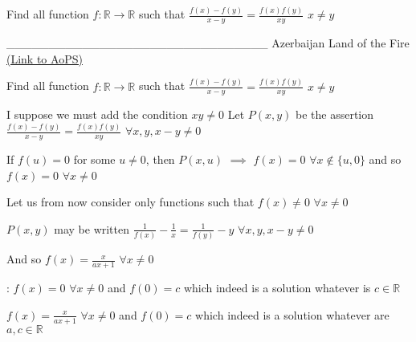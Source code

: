 \begin{problem}
	Find all function $f: \mathbb{R}\to\mathbb{R}$ such that  $\frac{f(x)-f(y)}{x-y}=\frac{f(x)f(y)}{xy} $
$x{\neq}y$



_______________________________
Azerbaijan Land of the Fire 
	\flushright \href{https://artofproblemsolving.com/community/c6h474469}{(Link to AoPS)}
\end{problem}



\begin{solution}
	\begin{tcolorbox}Find all function $f: \mathbb{R}\to\mathbb{R}$ such that  $\frac{f(x)-f(y)}{x-y}=\frac{f(x)f(y)}{xy} $
$x{\neq}y$\end{tcolorbox}
I suppose we must add the condition $xy\ne 0$
Let $P(x,y)$ be the assertion $\frac{f(x)-f(y)}{x-y}=\frac{f(x)f(y)}{xy}$ $\forall x,y,x-y\ne 0$

If $f(u)=0$ for some $u\ne 0$, then $P(x,u)$ $\implies$ $f(x)=0$ $\forall x\notin\{u,0\}$ and so $f(x)=0$ $\forall x\ne 0$

Let us from now consider only functions such that $f(x)\ne 0$ $\forall x\ne 0$

$P(x,y)$ may be written $\frac 1{f(x)}-\frac 1x=\frac 1{f(y)}-y$ $\forall x,y,x-y\ne 0$

And so $f(x)=\frac x{ax+1}$ $\forall x\ne 0$

 :
$f(x)=0$ $\forall x\ne 0$ and $f(0)=c$ which indeed is a solution whatever is $c\in\mathbb R$

$f(x)=\frac {x}{ax+1}$ $\forall x\ne 0$ and $f(0)=c$ which indeed is a solution whatever are $a,c\in\mathbb R$
\end{solution}



